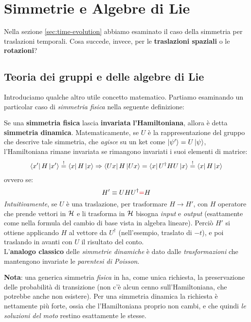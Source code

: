 \documentclass[../../FisicaTeorica.tex]{subfiles}
\begin{document}
\section{Simmetrie e Algebre di Lie}
Nella sezione \ref{sec:time-evolution} abbiamo esaminato il caso della simmetria per traslazioni temporali.
Cosa succede, invece, per le \textbf{traslazioni spaziali} o le \textbf{rotazioni}?

\subsection{Teoria dei gruppi e delle algebre di Lie}
Introduciamo qualche altro utile concetto matematico.
Partiamo esaminando un particolar caso di \textit{simmetria fisica} nella seguente definizione:

\begin{dfn}
Se una \textbf{simmetria fisica} lascia \textbf{invariata} \textbf{l'Hamiltoniana}, allora è detta \textbf{simmetria dinamica}. Matematicamente, se $U$ è la rappresentazione del gruppo che descrive tale simmetria, che \textit{agisce} su un ket come $\ket{\psi'} = U\ket{\psi}$, l'Hamiltoniana rimane invariata se rimangono invariati i suoi elementi di matrice:
\begin{align*}
\bra{x'}H\ket{x'} \overset{!}{=} \bra{x}H\ket{x}\Rightarrow \bra{Ux} H \ket{Ux}=\bra{x}U^\dag H U \ket{x} \overset{!}{=} \bra{x}H\ket{x}
\end{align*}
ovvero se:
\[ %
H' \equiv UHU^\dag \textcolor{Red}{=} H
\]
\textit{Intuitivamente}, se $U$ è una traslazione, per trasformare $H\to H'$, con $H$ operatore che prende vettori in $\mathcal{H}$ e li trasforma in $\mathcal{H}$ bisogna  \textit{input} e \textit{output} (esattamente come nella formula del cambio di base vista in algebra lineare). Perciò $H'$ si ottiene applicando $H$ al vettore  da $U^\dag$ (nell'esempio, traslato di $-t$), e poi traslando in avanti con $U$ il risultato del conto.\\

L'\textbf{analogo classico} delle \textit{simmetrie dinamiche} è dato dalle \textit{trasformazioni} che mantengono invariate le \textit{parentesi di Poisson}.
\end{dfn}
\textbf{Nota}: una generica simmetria \textit{fisica} in \MQ ha, come unica richiesta, la preservazione delle probabilità di transizione (non c'è alcun cenno sull'Hamiltoniana, che potrebbe anche non esistere). Per una simmetria dinamica la richiesta è nettamente più forte, ossia che l'Hamiltoniana proprio non cambi, e che quindi \textit{le soluzioni del moto} restino esattamente le stesse.\\
\end{document}
